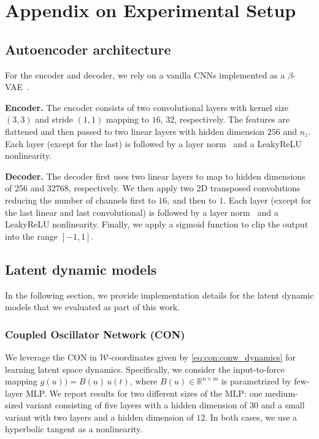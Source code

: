 \section{Appendix on Experimental Setup}\label{sec:apx-con:experimental_setup}

\subsection{Autoencoder architecture}
For the encoder and decoder, we rely on a vanilla \glspl{CNN} implemented as a $\beta$-\gls{VAE}~\citep{kingma2014auto}.

\textbf{Encoder.} The encoder consists of two convolutional layers with kernel size $(3, 3)$ and stride $(1, 1)$ mapping to $16$, $32$, respectively.
The features are flattened and then passed to two linear layers with hidden dimension $256$ and $n_z$.
Each layer (except for the last) is followed by a layer norm~\citep{ba2016layer} and a LeakyReLU nonlinearity.

\textbf{Decoder.} The decoder first uses two linear layers to map to hidden dimensions of $256$ and $32768$, respectively.
We then apply two 2D transposed convolutions~\citep{dumoulin2016guide} reducing the number of channels first to $16$, and then to $1$.
Each layer (except for the last linear and last convolutional) is followed by a layer norm~\citep{ba2016layer} and a LeakyReLU nonlinearity.
Finally, we apply a sigmoid function to clip the output into the range $[-1, 1]$.

\subsection{Latent dynamic models}\label{sub:apx-con:latent_dynamic_models}
In the following section, we provide implementation details for the latent dynamic models that we evaluated as part of this work.

\subsubsection{Coupled Oscillator Network (CON)}\label{ssub:apx-con:latent_space_dynamic_models:con}
We leverage the \gls{CON} in $\mathcal{W}$-coordinates given by \eqref{eq:con:conw_dynamics} for learning latent space dynamics. 
Specifically, we consider the input-to-force mapping $g(u)) = B(u) \, u(t)$, where $B(u) \in \mathbb{R}^{n \times m}$ is parametrized by few-layer \gls{MLP}. We report results for two different sizes of the \gls{MLP}: one medium-sized variant consisting of five layers with a hidden dimension of $30$ and a small variant with two layers and a hidden dimension of $12$. In both cases, we use a hyperbolic tangent as a nonlinearity.


